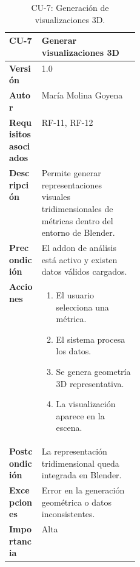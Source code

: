 \begin{table}[p]
\centering
\begin{tabularx}{\linewidth}{p{0.25\linewidth} X}
\toprule
\textbf{CU-7} & Generar visualizaciones 3D \\
\midrule
\textbf{Versión} & 1.0 \\
\textbf{Autor} & María Molina Goyena \\
\textbf{Requisitos asociados} & RF-11, RF-12 \\
\textbf{Descripción} & Permite generar representaciones visuales tridimensionales de métricas dentro del entorno de Blender. \\
\textbf{Precondición} & El addon de análisis está activo y existen datos válidos cargados. \\
\textbf{Acciones} &
\begin{minipage}[t]{\linewidth}
\begin{enumerate}
    \item El usuario selecciona una métrica.
    \item El sistema procesa los datos.
    \item Se genera geometría 3D representativa.
    \item La visualización aparece en la escena.
\end{enumerate}
\end{minipage} \\
\textbf{Postcondición} & La representación tridimensional queda integrada en Blender. \\
\textbf{Excepciones} & Error en la generación geométrica o datos inconsistentes. \\
\textbf{Importancia} & Alta \\
\bottomrule
\end{tabularx}
\caption{CU-7: Generación de visualizaciones 3D.}
\label{tab:cu7}
\end{table}

